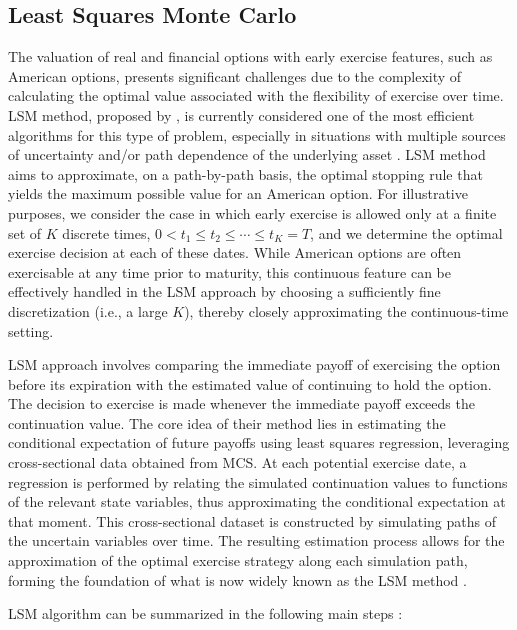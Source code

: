\documentclass[pdflatex,sn-basic]{sn-jnl}%
\theoremstyle{thmstyleone}%
\theoremstyle{thmstyletwo}%
\theoremstyle{thmstylethree}%
\begin{document}
\subsection{Least Squares Monte Carlo}\label{subsec45}

The valuation of real and financial options with early exercise features, such as American options, presents significant challenges due to the complexity of calculating the optimal value associated with the flexibility of exercise over time. LSM method, proposed by \cite{ref14}, is currently considered one of the most efficient algorithms for this type of problem, especially in situations with multiple sources of uncertainty and/or path dependence of the underlying asset \citep{ref16, ref15}. LSM method aims to approximate, on a path-by-path basis, the optimal stopping rule that yields the maximum possible value for an American option. For illustrative purposes, we consider the case in which early exercise is allowed only at a finite set of $K$ discrete times, $0 < t_1 \leq t_2 \leq \cdots \leq t_K = T$, and we determine the optimal exercise decision at each of these dates. While American options are often exercisable at any time prior to maturity, this continuous feature can be effectively handled in the LSM approach by choosing a sufficiently fine discretization (i.e., a large $K$), thereby closely approximating the continuous-time setting.

LSM approach involves comparing the immediate payoff of exercising the option before its expiration with the estimated value of continuing to hold the option. The decision to exercise is made whenever the immediate payoff exceeds the continuation value. The core idea of their method lies in estimating the conditional expectation of future payoffs using least squares regression, leveraging cross-sectional data obtained from MCS. At each potential exercise date, a regression is performed by relating the simulated continuation values to functions of the relevant state variables, thus approximating the conditional expectation at that moment. This cross-sectional dataset is constructed by simulating paths of the uncertain variables over time. The resulting estimation process allows for the approximation of the optimal exercise strategy along each simulation path, forming the foundation of what is now widely known as the LSM method \citep{ref14}.

LSM algorithm can be summarized in the following main steps \citep{ref14, ref15}:
\end{document}
